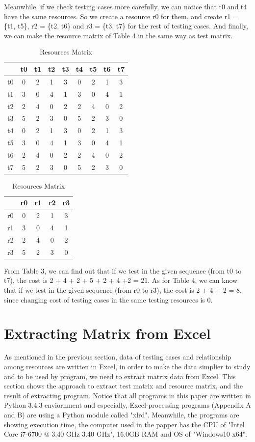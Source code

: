 \documentclass[12pt,a4paper]{article}
\begin{document}
Meanwhile, if we check testing cases more carefully, we can notice that t0 and t4 have the same resources. So we create a resource r0 for them, and create r1 = \{t1, t5\}, r2 = \{t2, t6\} and r3 = \{t3, t7\} for the rest of testing cases. And finally, we can make the resource matrix of Table 4 in the same way as test matrix. 

\begin{table}[htbp]
\parbox{.4\textwidth}{
\centering
\caption{Test Matrix}
\begin{tabular}{|c|cccccccc|}\hline
	 & t0 & t1 & t2 & t3 & t4 & t5 & t6 & t7 \\\hline
	t0 & 0 & 2 & 1 & 3 & 0 & 2 & 1 & 3\\
	t1 & 3 & 0 & 4 & 1 & 3 & 0 & 4 & 1\\
	t2 & 2 & 4 & 0 & 2 & 2 & 4 & 0 & 2\\
	t3 & 5 & 2 & 3 & 0 & 5 & 2 & 3 & 0\\
	t4 & 0 & 2 & 1 & 3 & 0 & 2 & 1 & 3\\
	t5 & 3 & 0 & 4 & 1 & 3 & 0 & 4 & 1\\
	t6 & 2 & 4 & 0 & 2 & 2 & 4 & 0 & 2\\
	t7 & 5 & 2 & 3 & 0 & 5 & 2 & 3 & 0\\\hline
\end{tabular}
}
\hfill
\parbox{.4\textwidth}{
\centering
\caption{Resources Matrix}
\begin{tabular}{|c|cccc|}\hline
	 & r0 & r1 & r2 & r3\\\hline
	r0 & 0 & 2 & 1 & 3\\
	r1 & 3 & 0 & 4 & 1\\
	r2 & 2 & 4 & 0 & 2\\
	r3 & 5 & 2 & 3 & 0\\\hline
\end{tabular}
}
\end{table}

From Table 3, we can find out that if we test in the given sequence (from t0 to t7), the cost is 2 + 4 + 2 + 5 + 2 + 4 +2 = 21. As for Table 4, we can know that if we test in the given sequence (from r0 to r3), the cost is 2 + 4 + 2 = 8, since changing cost of testing cases in the same testing resources is 0.

\section{Extracting Matrix from Excel}

As mentioned in the previous section, data of testing cases and relationship among resources are written in Excel, in order to make the data simplier to study and to be used by program, we need to extract matrix data from Excel. This section shows the approach to extract test matrix and resource matrix, and the result of extracting program. Notice that all programs in this paper are written in Python 3.4.3 enviornment and especially, Excel-processing programs (Appendix A and B) are using a Python module called "xlrd". Meanwhile, the programs are showing execution time, the computer used in the papper has the CPU of "Intel Core i7-6700 @ 3.40 GHz 3.40 GHz", 16.0GB RAM and OS of "Windows10 x64".
\end{document}
